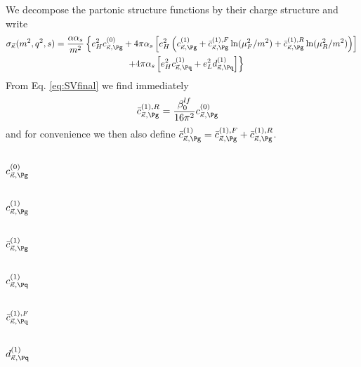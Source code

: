 
We decompose the partonic structure functions by their charge structure and write
\begin{align}
\sigma_{\vec \kappa}(m^2,q^2,s) &= \frac{\alpha\alpha_s}{m^2}\left\{e_H^2 c_{\vec\kappa,\Pg}^{(0)} + 4\pi\alpha_s\left[e_H^2\left(c_{\vec\kappa,\Pg}^{(1)} + \bar c_{\vec\kappa,\Pg}^{(1),F}\ln(\mu_F^2/m^2)  + \bar c_{\vec\kappa,\Pg}^{(1),R}\ln(\mu_R^2/m^2) \right) \right] \right.\nonumber\\
 &\hspace{80pt} \left. + 4\pi\alpha_s\left[e_H^2 c_{\vec \kappa,\Pq}^{(1)} + e_L^2 d_{\vec \kappa,\Pq}^{(1)}\right]\right\}
\end{align}
From Eq. \ref{eq:SVfinal} we find immediately
\begin{align}
\bar c_{\vec\kappa,\Pg}^{(1),R} &= \frac{\beta_0^{lf}}{16\pi^2} c_{\vec\kappa,\Pg}^{(0)}
\end{align}
and for convenience we then also define $\bar c_{\vec\kappa,\Pg}^{(1)} = \bar c_{\vec\kappa,\Pg}^{(1),F} + \bar c_{\vec\kappa,\Pg}^{(1),R}$.

\subsection{$c_{\vec\kappa,\Pg}^{(0)}$}


\subsection{$c_{\vec\kappa,\Pg}^{(1)}$}


\subsection{$\bar c_{\vec\kappa,\Pg}^{(1)}$}


\subsection{$c_{\vec\kappa,\Pq}^{(1)}$}


\subsection{$\bar c_{\vec\kappa,\Pq}^{(1),F}$}


\subsection{$d_{\vec\kappa,\Pq}^{(1)}$}

